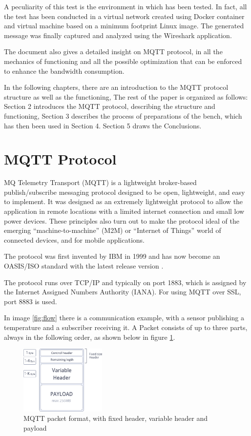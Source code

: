 \documentclass[journal]{IEEEtran}
\begin{document}
A peculiarity of this test is the environment in which has been tested. In fact, all the test has been conducted in a virtual network created using Docker container and virtual machine based on a minimum footprint Linux image. The generated message was finally captured and analyzed using the Wireshark application. 

The document also gives a detailed insight on MQTT protocol, in all the mechanics of functioning and all the possible optimization that can be enforced to enhance the bandwidth consumption. 

In the following chapters, there are an introduction to the MQTT protocol structure as well as the functioning, 
The rest of the paper is organized as follows: Section 2 introduces the MQTT protocol, 
describing the structure and functioning,
Section 3 describes the process of preparations of the bench, which has then
been used in Section 4. Section 5 draws the Conclusions.

\section{MQTT Protocol}
MQ Telemetry Transport (MQTT) is a lightweight broker-based publish/subscribe messaging protocol designed to be open, lightweight, and easy to implement. It was designed as an extremely lightweight protocol to allow the application in remote locations with a limited internet connection and small low power devices. These principles also turn out to make the protocol ideal of the emerging “machine-to-machine” (M2M) or “Internet of Things” world of connected devices, and for mobile applications. 

The protocol was first invented by IBM in 1999 and has now become an OASIS/ISO standard with the latest release version \cite{mqtt_spec}.

The protocol runs over TCP/IP and typically on port 1883, which is assigned by the Internet
Assigned Numbers Authority (IANA). For using MQTT over SSL, port 8883 is used. 

In image \ref{fig:flow} there is a communication example, with a sensor publishing a temperature and a subscriber receiving it. 
A Packet consists of up to three parts, always in the following order, as shown below in figure \ref{fig:packet}.

\begin{figure}[h]
	\centering
	\includegraphics[width=0.38\textwidth]{mqtt_2}	
	\caption{MQTT packet format, with fixed header, variable header and payload}
	\label{fig:packet}
\end{figure}
\end{document}
